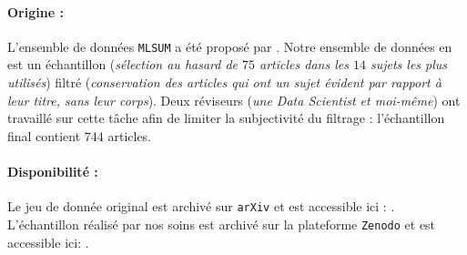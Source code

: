 		\paragraph{Origine :}
		L'ensemble de données \texttt{MLSUM} a été proposé par \cite{scialom-etal:2020:mlsum-multilingual-summarization}.
		Notre ensemble de données en est un échantillon (\textit{sélection au hasard de $75$ articles dans les $14$ sujets les plus utilisés}) filtré (\textit{conservation des articles qui ont un sujet évident par rapport à leur titre, sans leur corps}).
		Deux réviseurs (\textit{une Data Scientist et moi-même}) ont travaillé sur cette tâche afin de limiter la subjectivité du filtrage : l'échantillon final contient $744$ articles.
		
		\paragraph{Disponibilité :}
		Le jeu de donnée original est archivé sur \texttt{arXiv} et est accessible ici : \cite{scialom-etal:2020:mlsum-multilingual-summarization}.
		L'échantillon réalisé par nos soins est archivé sur la plateforme \texttt{Zenodo} et est accessible ici: \cite{schild-adler:2023:subset-mlsum-multilingual}.